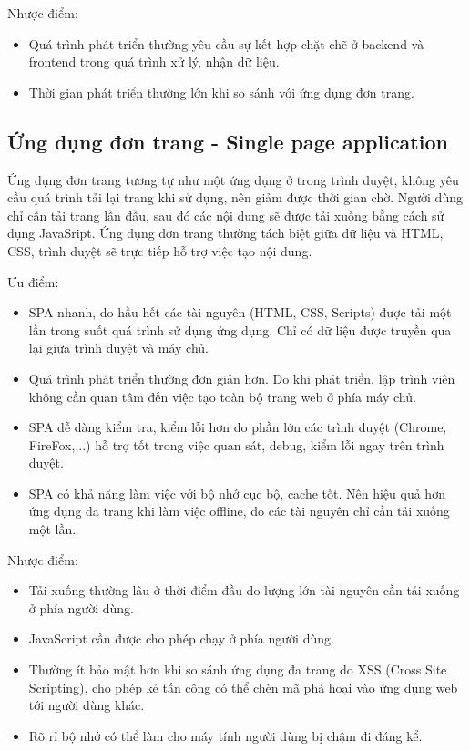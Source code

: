 Nhược điểm: 
\begin{itemize}
    \item Quá trình phát triển thường yêu cầu sự kết hợp chặt chẽ ở backend và frontend trong quá trình xử lý, nhận dữ liệu.
    \item Thời gian phát triển thường lớn khi so sánh với ứng dụng đơn trang.
\end{itemize}
\subsection{Ứng dụng đơn trang - Single page application}
Ứng dụng đơn trang tương tự như một ứng dụng ở trong trình duyệt, không yêu cầu quá trình tải lại trang khi sử dụng, nên giảm được thời gian chờ. Người dùng chỉ cần tải trang lần đầu, sau đó các nội dung sẽ được tải xuống bằng cách sử dụng JavaSript.
Ứng dụng đơn trang thường tách biệt giữa dữ liệu và HTML, CSS, trình duyệt sẽ trực tiếp hỗ trợ việc tạo nội dung. 


Ưu điểm: 
\begin{itemize}
    \item SPA nhanh, do hầu hết các tài nguyên (HTML, CSS, Scripts) được tải một lần trong suốt quá trình sử dụng ứng dụng. Chỉ có dữ liệu được truyền qua lại giữa trình duyệt và máy chủ.
    \item Quá trình phát triển thường đơn giản hơn. Do khi phát triển, lập trình viên không cần quan tâm đến việc tạo toàn bộ trang web ở phía máy chủ.
    \item SPA dễ dàng kiểm tra, kiểm lỗi hơn do phần lớn các trình duyệt (Chrome, FireFox,...) hỗ trợ tốt trong việc quan sát, debug, kiểm lỗi ngay trên trình duyệt.
    \item SPA có khả năng làm việc với bộ nhớ cục bộ, cache tốt. Nên hiệu quả hơn ứng dụng đa trang khi làm việc offline, do các tài nguyên chỉ cần tải xuống một lần.
\end{itemize}
Nhược điểm: 
\begin{itemize}
    \item Tải xuống thường lâu ở thời điểm đầu do lượng lớn tài nguyên cần tải xuống ở phía người dùng.
    \item JavaScript cần được cho phép chạy ở phía người dùng.
    \item Thường ít bảo mật hơn khi so sánh ứng dụng đa trang do XSS (Cross Site Scripting), cho phép kẻ tấn công có thể chèn mã phá hoại vào ứng dụng web tới người dùng khác.
    \item Rõ rỉ bộ nhớ có thể làm cho máy tính người dùng bị chậm đi đáng kể.
\end{itemize}

